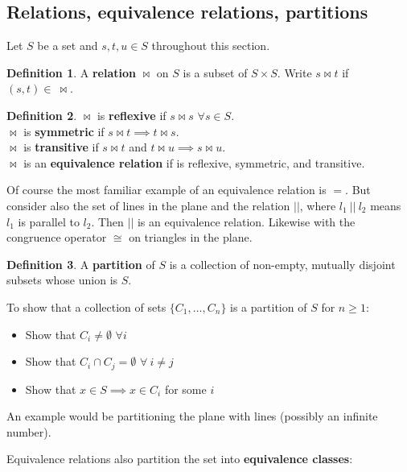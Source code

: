 \documentclass{article}
\theoremstyle{definition}
\newtheorem{definition}{Definition}[section]
\begin{document}
\subsection{Relations, equivalence relations, partitions}

Let $S$ be a set and $s, t, u \in S$ throughout this section.

\begin{definition}
A \textbf{relation} $\bowtie$ on $S$ is a subset of $S \times S$. Write $s \bowtie t$ if $(s, t) \in \ \bowtie$.
\end{definition}

\begin{definition}
$\bowtie$ is \textbf{reflexive} if $s \bowtie s$ $\forall s \in S$. \\
$\bowtie$ is \textbf{symmetric} if $s \bowtie t \implies t \bowtie s$. \\
$\bowtie$ is \textbf{transitive} if $s \bowtie t$ and $t \bowtie u \implies s \bowtie u$. \\
$\bowtie$ is an \textbf{equivalence relation} if is reflexive, symmetric, and transitive.
\end{definition}

Of course the most familiar example of an equivalence relation is $=$. But consider also the set of lines in the plane and the relation $||$, where $l_1 \ || \ l_2$ means $l_1$ is parallel to $l_2$. Then $||$ is an equivalence relation. Likewise with the congruence operator $\cong$ on triangles in the plane.

\begin{definition}
A \textbf{partition} of $S$ is a collection of non-empty, mutually disjoint subsets whose union is $S$.
\end{definition}

To show that a collection of sets $\{ C_1, \ldots, C_n \}$ is a partition of $S$ for $n \ge 1$:

\begin{itemize}
\item Show that $C_i \neq \emptyset$ $\forall i$
\item Show that $C_i \cap C_j = \emptyset$ $\forall \ i \neq j$
\item Show that $x \in S \implies x \in C_i$ for some $i$
\end{itemize}

An example would be partitioning the plane with lines (possibly an infinite number).

Equivalence relations also partition the set into \textbf{equivalence classes}:
\end{document}
